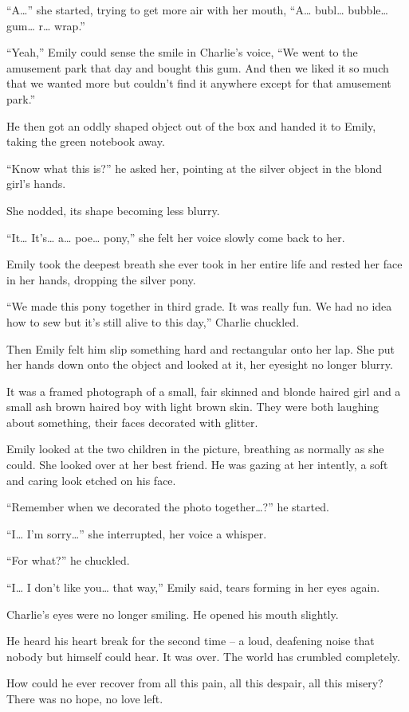 “A…” she started, trying to get more air with her mouth, “A… bubl… bubble… gum… r… wrap.”

“Yeah,” Emily could sense the smile in Charlie’s voice, “We went to the amusement park that day and bought this gum. And then we liked it so much that we wanted more but couldn’t find it anywhere except for that amusement park.”

He then got an oddly shaped object out of the box and handed it to Emily, taking the green notebook away.

“Know what this is?” he asked her, pointing at the silver object in the blond girl’s hands.

She nodded, its shape becoming less blurry.

“It… It’s… a… poe… pony,” she felt her voice slowly come back to her.

Emily took the deepest breath she ever took in her entire life and rested her face in her hands, dropping the silver pony.

“We made this pony together in third grade. It was really fun. We had no idea how to sew but it’s still alive to this day,” Charlie chuckled.

Then Emily felt him slip something hard and rectangular onto her lap. She put her hands down onto the object and looked at it, her eyesight no longer blurry.

It was a framed photograph of a small, fair skinned and blonde haired girl and a small ash brown haired boy with light brown skin. They were both laughing about something, their faces decorated with glitter.

Emily looked at the two children in the picture, breathing as normally as she could. She looked over at her best friend. He was gazing at her intently, a soft and caring look etched on his face.

“Remember when we decorated the photo together…?” he started.

“I… I’m sorry…” she interrupted, her voice a whisper.

“For what?” he chuckled.

“I… I don’t like you… that way,” Emily said, tears forming in her eyes again.

Charlie’s eyes were no longer smiling. He opened his mouth slightly.

He heard his heart break for the second time – a loud, deafening noise that nobody but himself could hear. It was over. The world has crumbled completely.

How could he ever recover from all this pain, all this despair, all this misery? There was no hope, no love left.

